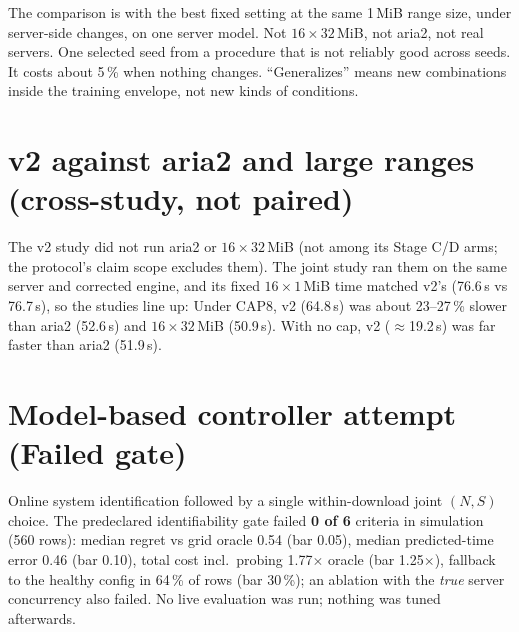 \begin{careful}
The comparison is with the best fixed setting at the same 1\,MiB range size, under server-side changes, on one server model. Not $16\times32$\,MiB, not aria2, not real servers. One selected seed from a procedure that is not reliably good across seeds. It costs about 5\,\% when nothing changes. ``Generalizes'' means new combinations inside the training envelope, not new kinds of conditions.
\end{careful}

\section{v2 against aria2 and large ranges (cross-study, not paired)}
The v2 study did not run aria2 or $16\times32$\,MiB (not among its Stage C/D arms; the protocol's claim scope excludes them). The joint study ran them on the same server and corrected engine, and its fixed $16\times1$\,MiB time matched v2's (76.6\,s vs 76.7\,s), so the studies line up:
Under CAP8, v2 (64.8\,s) was about 23--27\,\% slower than aria2 (52.6\,s) and $16\times32$\,MiB (50.9\,s). With no cap, v2 ($\approx$19.2\,s) was far faster than aria2 (51.9\,s).

\section{Model-based controller attempt (Failed gate)}
Online system identification followed by a single within-download joint $(N,S)$ choice. The predeclared identifiability gate failed \textbf{0 of 6} criteria in simulation (560 rows): median regret vs grid oracle 0.54 (bar 0.05), median predicted-time error 0.46 (bar 0.10), total cost incl.\ probing 1.77$\times$ oracle (bar 1.25$\times$), fallback to the healthy config in 64\,\% of rows (bar 30\,\%); an ablation with the \emph{true} server concurrency also failed. No live evaluation was run; nothing was tuned afterwards.

